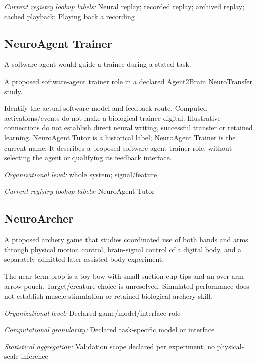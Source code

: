 \noindent\textit{Current registry lookup labels:} Neural replay; recorded replay; archived replay; cached playback; Playing back a recording\par

\subsection*{NeuroAgent Trainer}
\noindent A software agent would guide a trainee during a stated task.\par
\noindent A proposed software-agent trainer role in a declared Agent2Brain NeuroTransfer study.\par
\noindent Identify the actual software model and feedback route. Computed activations/events do not make a biological trainee digital. Illustrative connections do not establish direct neural writing, successful transfer or retained learning. NeuroAgent Tutor is a historical label; NeuroAgent Trainer is the current name. It describes a proposed software-agent trainer role, without selecting the agent or qualifying its feedback interface.\par
\noindent\textit{Organizational level:} whole system; signal/feature\par

\noindent\textit{Current registry lookup labels:} NeuroAgent Tutor\par

\begin{samepage}
\subsection*{NeuroArcher}
\noindent A proposed archery game that studies coordinated use of both hands and arms through physical motion control, brain-signal control of a digital body, and a separately admitted later assisted-body experiment.\par
\end{samepage}
\noindent The near-term prop is a toy bow with small suction-cup tips and an over-arm arrow pouch. Target/creature choice is unresolved. Simulated performance does not establish muscle stimulation or retained biological archery skill.\par
\noindent\textit{Organizational level:} Declared game/model/interface role\par
\noindent\textit{Computational granularity:} Declared task-specific model or interface\par
\begin{samepage}
\noindent\textit{Statistical aggregation:} Validation scope declared per experiment; no physical-scale inference\par\nopagebreak[4]

\end{samepage}


